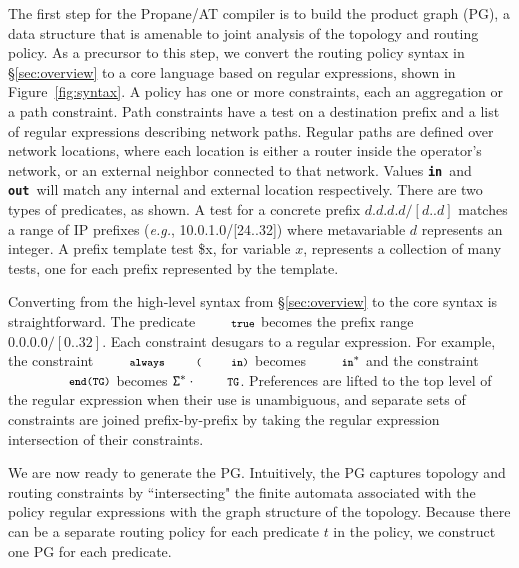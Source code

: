 \documentclass[numbers, 10pt]{sigplanconf}
\newcommand{\EG}{\emph{e.g.}}
\newcommand{\sysname}{{\text{}\small \sf Propane/AT}\xspace}
\newcommand{\CD}[1]{\texttt{\small #1}}
\newcommand{\KW}[1]{\texttt{\small\bfseries{#1}}}
\newcommand{\True}{\CD{true}}
\newcommand{\Prefer}{\texttt{>>}}
\newcommand{\Path}{\texttt{=>}}
\newcommand{\In}{\KW{in}}
\newcommand{\Out}{\KW{out}}
\newcommand{\Exit}{\KW{exit}}
\newcommand{\End}{\KW{end}}
\newcommand{\Always}{\KW{always}}
\begin{document}
The first step for the \sysname compiler is to build the product graph (PG), a data structure that is amenable to joint analysis of the topology and routing policy. As a precursor to this step, we convert the routing policy syntax in \S\ref{sec:overview} to a core language based on regular expressions, shown in Figure~\ref{fig:syntax}.
%
A policy has one or more constraints, each an aggregation or a path constraint. Path constraints have a test on a destination prefix and a list of regular expressions describing network paths. Regular paths are defined over network locations, where each location is either a router inside the operator's network, or an external neighbor connected to that network. Values \In\ and \Out\ will match any internal and external location respectively. There are two types of predicates, as shown. A test for a concrete prefix $d.d.d.d/[d..d]$ matches a range of IP prefixes (\EG, 10.0.1.0/[24..32]) where metavariable $d$ represents an integer. A prefix template test {\small\$x}, for variable $x$, represents a collection of many tests, one for each prefix represented by the template.

Converting from the high-level syntax from \S\ref{sec:overview} to the core syntax is straightforward. The predicate $\True$ becomes the prefix range $0.0.0.0/[0..32]$.
%
Each constraint desugars to a regular expression. For example, the constraint $\Always\CD{(\In)}$ becomes $\In^*$ and the constraint $\CD{\End(TG)}$ becomes $\mathtt{\Sigma}^* \cdot \CD{TG}$.
%
Preferences are lifted to the top level of the regular expression when their use is unambiguous, and separate sets of constraints are joined prefix-by-prefix by taking the regular expression intersection of their constraints.

%
%

We are now ready to generate the PG. Intuitively, the PG captures topology and routing constraints by ``intersecting" the finite automata associated with the policy regular expressions with the graph structure of the topology.
%
%
Because there can be a separate routing policy for each predicate $t$ in the policy, we construct one PG for each predicate.
\end{document}
